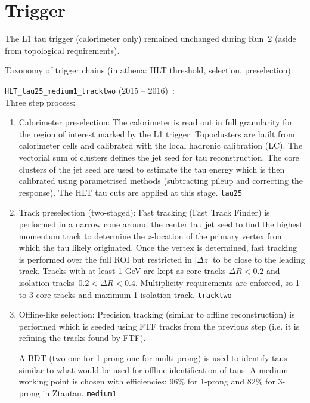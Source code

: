 \section{Trigger}
\label{sec:trigger}


The L1 tau trigger (calorimeter only) remained unchanged during Run~2
(aside from topological requirements).

Taxonomy of trigger chains (in athena: HLT threshold, selection, preselection):

\vspace{1em}

\verb|HLT_tau25_medium1_tracktwo| (2015 -- 2016)~\cite{ATLAS-CONF-2017-061}:\\
Three step process:
\begin{enumerate}
\item Calorimeter preselection: The calorimeter is read out in full
  granularity for the region of interest marked by the L1
  trigger. Topoclusters are built from calorimeter cells and
  calibrated with the local hadronic calibration (LC). The vectorial
  sum of clusters defines the jet seed for tau reconstruction. The
  core clusters of the jet seed are used to estimate the tau energy
  which is then calibrated using parametrised methods (subtracting
  pileup and correcting the response). The HLT tau \pT cuts are
  applied at this stage. \verb|tau25|

\item Track preselection (two-staged): Fast tracking (Fast Track
  Finder) is performed in a narrow cone around the center tau jet seed
  to find the highest momentum track to determine the $z$-location of
  the primary vertex from which the tau likely originated. Once the
  vertex is determined, fast tracking is performed over the full ROI
  but restricted in $|\Delta z|$ to be close to the leading
  track. Tracks with at least 1 GeV are kept as core tracks
  $\Delta R < 0.2$ and isolation tracks~$0.2 < \Delta R <
  0.4$. Multiplicity requirements are enforced, so 1 to 3 core tracks
  and maximum 1 isolation track. \verb|tracktwo|

\item Offline-like selection: Precision tracking (similar to offline
  reconstruction) is performed which is seeded using FTF tracks from
  the previous step (i.e. it is refining the tracks found by FTF).


  A BDT (two one for
  1-prong one for multi-prong) is used to identify taus similar to
  what would be used for offline identification of taus. A medium
  working point is chosen with efficiencies: 96\% for 1-prong and 82\%
  for 3-prong in Ztautau. \verb|medium1|
\end{enumerate}

